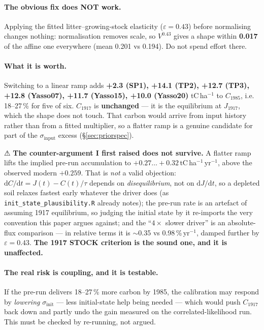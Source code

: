 \documentclass[11pt]{article}
\newcommand{\sinit}{\sigma_{\mathrm{init}}}
\newcommand{\sinput}{\sigma_{\mathrm{input}}}
\begin{document}
\paragraph{The obvious fix does NOT work.} Applying the fitted litter--growing-stock elasticity
($\varepsilon = 0.43$) before normalising changes nothing: normalisation removes scale, so
$V^{0.43}$ gives a shape within \textbf{0.017} of the affine one everywhere (mean 0.201 vs 0.194).
Do not spend effort there.

\paragraph{What it is worth.} Switching to a linear ramp adds \textbf{+2.3 (SP1), +14.1 (TP2),
+12.7 (TP3), +12.8 (Yasso07), +11.7 (Yasso15), +10.0 (Yasso20)} tC\,ha$^{-1}$ to $C_{1985}$, i.e.
18--27\,\% for five of six. $C_{1917}$ is \textbf{unchanged} --- it is the equilibrium at $J_{1917}$,
which the shape does not touch. That carbon would arrive from input history rather than from a fitted
multiplier, so a flatter ramp is a genuine candidate for part of the $\sinput$ excess
(\S\ref{sec:priorspec}).

⚠ \textbf{The counter-argument I first raised does not survive.} A flatter ramp lifts the implied
pre-run accumulation to $+0.27\ldots+0.32$\,tC\,ha$^{-1}$\,yr$^{-1}$, above the observed modern
$+0.259$. That is \emph{not} a valid objection: $\mathrm{d}C/\mathrm{d}t = J(t) - C(t)/\tau$ depends
on \emph{disequilibrium}, not on $\mathrm{d}J/\mathrm{d}t$, so a depleted soil relaxes fastest early
whatever the driver does (as \texttt{init\_state\_plausibility.R} already notes); the pre-run rate is
an artefact of assuming 1917 equilibrium, so judging the initial state by it re-imports the very
convention this paper argues against; and the ``$4\times$ slower driver'' is an absolute-flux
comparison --- in relative terms it is $\sim$0.35 vs 0.98\,\%\,yr$^{-1}$, damped further by
$\varepsilon = 0.43$. \textbf{The 1917 STOCK criterion is the sound one, and it is unaffected.}

\paragraph{The real risk is coupling, and it is testable.} If the pre-run delivers 18--27\,\% more
carbon by 1985, the calibration may respond by \emph{lowering} $\sinit$ --- less initial-state help
being needed --- which would push $C_{1917}$ back down and partly undo the gain measured on the
correlated-likelihood run. This must be checked by re-running, not argued.
\end{document}
